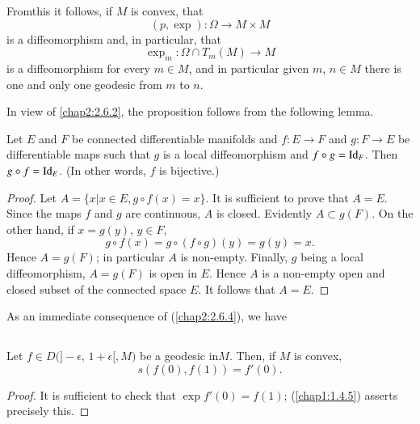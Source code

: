 \begin{remark*}
From\pageoriginale this it follows, if $M$ is convex, that
$$
(p,\exp):\Omega\to M\times M
$$
is a diffeomorphism and, in particular, that
$$
\exp_{m}:\Omega\cap T_{m}(M)\to M
$$
is a diffeomorphism for every $m\in M$, and in particular given $m$,
$n\in M$ there is one and only one geodesic from $m$ to $n$.
\end{remark*}

In view of \ref{chap2:2.6.2}, the proposition follows from the following
lemma.

\setcounter{lemma}{4}
\begin{lemma}[a]\label{chap2:lem2.6.5a}
Let $E$ and $F$ be connected differentiable manifolds and $f:E\to F$
and $g:F\to E$ be differentiable maps such that $g$ is a local
diffeomorphism and $f\circ g=\operatorname{Id}_{F}$. Then $g\circ f=\operatorname{Id}_{E}$. (In
other words, $f$ is bijective.) 
\end{lemma}

\begin{proof}
Let $A=\{x|x\in E,g\circ f(x)=x\}$. It is sufficient to prove that
$A=E$. Since the maps $f$ and $g$ are continuous, $A$ is
closed. Evidently $A\subset g(F)$. On the other hand, if $x=g(y)$,
$y\in F$,
$$
g\circ f(x)=g\circ(f\circ g)(y)=g(y)=x.
$$
Hence $A=g(F)$; in particular $A$ is non-empty. Finally, $g$ being a
local diffeomorphism, $A=g(F)$ is open in $E$. Hence $A$ is a
non-empty open and closed subset of the connected space $E$. It
follows that $A=E$.
\end{proof}

As an immediate consequence of (\ref{chap2:2.6.4}), we have 

\setcounter{subsection}{5}

\subsection{}\label{chap2:2.6.6}

\begin{coro*}
Let $f\in D(]-\epsilon$, $1+\epsilon[,M)$ be a geodesic
    in\pageoriginale $M$. Then, if $M$ is convex,
$$
s(f(0),f(1))=f'(0).
$$
\end{coro*}

\begin{proof}
It is sufficient to check that $\exp f'(0)=f(1)$; (\ref{chap1:1.4.5})
asserts precisely this.
\end{proof}

\subsection{}\label{chap2:defi2.6.7}

